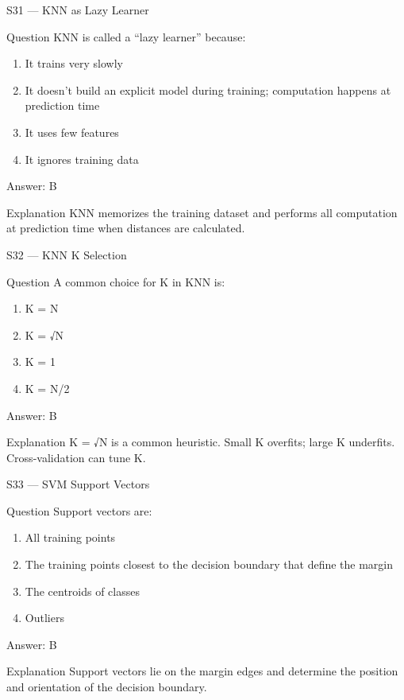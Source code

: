 \documentclass[aspectratio=169,8pt]{beamer}
\begin{document}
	\begin{frame}{S31 --- KNN as Lazy Learner}
		\begin{block}{Question}
			KNN is called a ``lazy learner'' because:
			\begin{enumerate}
				\item It trains very slowly
				\item It doesn't build an explicit model during training; computation happens at prediction time
				\item It uses few features
				\item It ignores training data
			\end{enumerate}
		\end{block}
		\begin{exampleblock}{Answer: B}\end{exampleblock}
		\begin{block}{Explanation}
			KNN memorizes the training dataset and performs all computation at prediction time when distances are calculated.
		\end{block}
	\end{frame}
	
	\begin{frame}{S32 --- KNN K Selection}
		\begin{block}{Question}
			A common choice for K in KNN is:
			\begin{enumerate}
				\item K = N
				\item K = √N
				\item K = 1
				\item K = N/2
			\end{enumerate}
		\end{block}
		\begin{exampleblock}{Answer: B}\end{exampleblock}
		\begin{block}{Explanation}
			K = √N is a common heuristic. Small K overfits; large K underfits. Cross-validation can tune K.
		\end{block}
	\end{frame}
	
	\begin{frame}{S33 --- SVM Support Vectors}
		\begin{block}{Question}
			Support vectors are:
			\begin{enumerate}
				\item All training points
				\item The training points closest to the decision boundary that define the margin
				\item The centroids of classes
				\item Outliers
			\end{enumerate}
		\end{block}
		\begin{exampleblock}{Answer: B}\end{exampleblock}
		\begin{block}{Explanation}
			Support vectors lie on the margin edges and determine the position and orientation of the decision boundary.
		\end{block}
	\end{frame}
	
\end{document}
